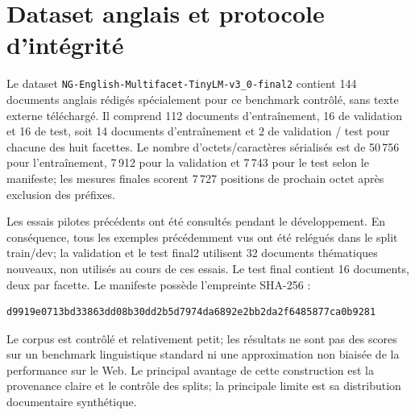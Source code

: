 \documentclass[11pt,a4paper]{article}
\begin{document}
\section{Dataset anglais et protocole d'intégrité}
Le dataset \texttt{NG-English-Multifacet-TinyLM-v3\_0-final2} contient 144 documents anglais rédigés spécialement pour ce benchmark contrôlé, sans texte externe téléchargé. Il comprend 112 documents d'entraînement, 16 de validation et 16 de test, soit 14 documents d'entraînement et 2 de validation / test pour chacune des huit facettes. Le nombre d'octets/caractères sérialisés est de 50\,756 pour l'entraînement, 7\,912 pour la validation et 7\,743 pour le test selon le manifeste; les mesures finales scorent 7\,727 positions de prochain octet après exclusion des préfixes.

Les essais pilotes précédents ont été consultés pendant le développement. En conséquence, tous les exemples précédemment vus ont été relégués dans le split train/dev; la validation et le test final2 utilisent 32 documents thématiques nouveaux, non utilisés au cours de ces essais. Le test final contient 16 documents, deux par facette. Le manifeste possède l'empreinte SHA-256 :
\begin{lstlisting}
d9919e0713bd33863dd08b30dd2b5d7974da6892e2bb2da2f6485877ca0b9281
\end{lstlisting}
Le corpus est contrôlé et relativement petit; les résultats ne sont pas des scores sur un benchmark linguistique standard ni une approximation non biaisée de la performance sur le Web. Le principal avantage de cette construction est la provenance claire et le contrôle des splits; la principale limite est sa distribution documentaire synthétique.
\end{document}
